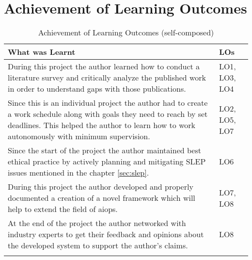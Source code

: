 \section{Achievement of Learning Outcomes}

\begin{longtable}{|p{140mm}|p{10mm}|}
    \hline
    \textbf{What was Learnt} & \textbf{LOs} \\ \hline
    During this project the author learned how to conduct a literature survey and critically analyze the published work in order to understand gaps with those publications. & LO1, LO3, LO4 \\ \hline
    Since this is an individual project the author had to create a work schedule along with goals they need to reach by set deadlines. This helped the author to learn how to work autonomously with minimum supervision. & LO2, LO5, LO7 \\ \hline
    Since the start of the project the author maintained best ethical practice by actively planning and mitigating SLEP issues mentioned in the chapter \ref{sec:slep}. & LO6 \\ \hline
    During this project the author developed and properly documented a creation of a novel framework which will help to extend the field of \ac{aiops}. & LO7, LO8 \\ \hline
    At the end of the project the author networked with industry experts to get their feedback and opinions about the developed system to support the author's claims. & LO8 \\ \hline
    \caption{Achievement of Learning Outcomes (self-composed)}
  \end{longtable}
  